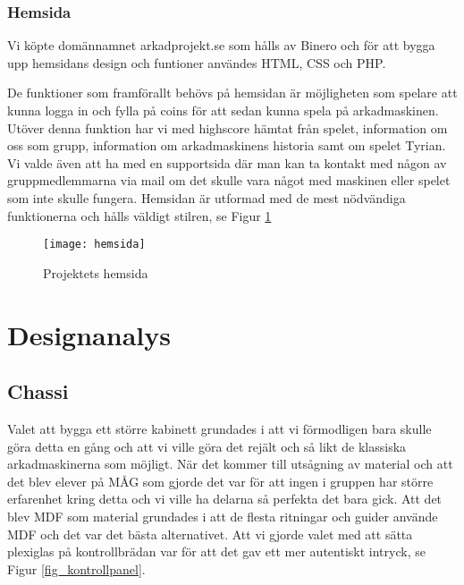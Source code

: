 \documentclass[12pt,fleqn,openany]{book} %
\begin{document}
\subsection{Hemsida}

Vi köpte domännamnet arkadprojekt.se som hålls av Binero och för att bygga upp hemsidans design och funtioner användes HTML, CSS och PHP.

De funktioner som framförallt behövs på hemsidan är möjligheten som spelare att kunna logga in och fylla på coins för att sedan kunna spela 
på arkadmaskinen. Utöver denna funktion har vi med highscore hämtat från spelet, information om oss som grupp, information om arkadmaskinens 
historia samt om spelet Tyrian. Vi valde även att ha med en supportsida där man kan ta kontakt med någon av gruppmedlemmarna via mail om det 
skulle vara något med maskinen eller spelet som inte skulle fungera. Hemsidan är utformad med de mest nödvändiga funktionerna och hålls väldigt stilren, se Figur \ref{fig_hemsida}
\begin{figure}[h]
\centering\texttt{[image: hemsida]}
\caption{Projektets hemsida}
\label{fig_hemsida}
\end{figure}

\chapter{Designanalys}


\section{Chassi}
Valet att bygga ett större kabinett grundades i att vi förmodligen bara skulle göra detta en gång och att vi ville göra det 
rejält och så likt de klassiska arkadmaskinerna som möjligt. När det kommer till utsågning av material och att det blev elever 
på MÅG som gjorde det var för att ingen i gruppen har större erfarenhet kring detta och vi ville ha delarna så perfekta det 
bara gick. Att det blev MDF som material grundades i att de flesta ritningar och guider använde MDF och det var det bästa 
alternativet. Att vi gjorde valet med att sätta plexiglas på kontrollbrädan var för att det gav ett mer autentiskt intryck, se Figur \ref{fig_kontrollpanel}. 
\end{document}
